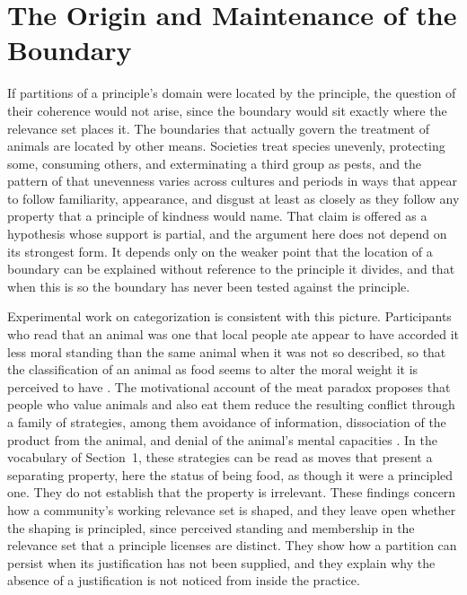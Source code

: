 \documentclass[11pt]{article}
\theoremstyle{definition}
\theoremstyle{plain}
\theoremstyle{definition}
\begin{document}
\section{The Origin and Maintenance of the Boundary}

If partitions of a principle's domain were located by the principle, the question of their coherence would not arise, since the boundary would sit exactly where the relevance set places it. The boundaries that actually govern the treatment of animals are located by other means. Societies treat species unevenly, protecting some, consuming others, and exterminating a third group as pests, and the pattern of that unevenness varies across cultures and periods in ways that appear to follow familiarity, appearance, and disgust at least as closely as they follow any property that a principle of kindness would name. That claim is offered as a hypothesis whose support is partial, and the argument here does not depend on its strongest form. It depends only on the weaker point that the location of a boundary can be explained without reference to the principle it divides, and that when this is so the boundary has never been tested against the principle.

Experimental work on categorization is consistent with this picture. Participants who read that an animal was one that local people ate appear to have accorded it less moral standing than the same animal when it was not so described, so that the classification of an animal as food seems to alter the moral weight it is perceived to have \cite{bratanova2011}. The motivational account of the meat paradox proposes that people who value animals and also eat them reduce the resulting conflict through a family of strategies, among them avoidance of information, dissociation of the product from the animal, and denial of the animal's mental capacities \cite{bastian2017}. In the vocabulary of Section~1, these strategies can be read as moves that present a separating property, here the status of being food, as though it were a principled one. They do not establish that the property is irrelevant. These findings concern how a community's working relevance set is shaped, and they leave open whether the shaping is principled, since perceived standing and membership in the relevance set that a principle licenses are distinct. They show how a partition can persist when its justification has not been supplied, and they explain why the absence of a justification is not noticed from inside the practice.
\end{document}
